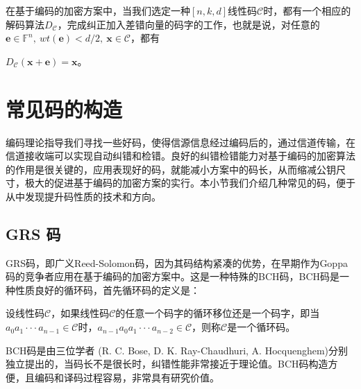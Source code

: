 \begin{define}[解码算法]
	在基于编码的加密方案中，当我们选定一种$[n,k,d]$线性码$\mathcal{C}$时，都有一个相应的解码算法$D_{\mathcal{C}}$，完成纠正加入差错向量的码字的工作，也就是说，对任意的$\textbf{e} \in \mathbb{F}^n,~wt(\textbf{e}) < d/2,~\textbf{x} \in \mathcal{C}$，都有
	
	\centering $D_{\mathcal{C}}(\textbf{x} + \textbf{e}) = \textbf{x}$。
\end{define}

\section{常见码的构造}
编码理论指导我们寻找一些好码，使得信源信息经过编码后的，通过信道传输，在信道接收端可以实现自动纠错和检错。良好的纠错检错能力对基于编码的加密算法的作用是很关键的，应用表现好的码，就能减小方案中的码长，从而缩减公钥尺寸，极大的促进基于编码的加密方案的实行。本小节我们介绍几种常见的码，便于从中发现提升码性质的技术和方向。

\subsection{GRS 码}
GRS码，即广义Reed-Solomon码，因为其码结构紧凑的优势，在早期作为Goppa码的竞争者应用在基于编码的加密方案中。这是一种特殊的BCH码，BCH码是一种性质良好的循环码，首先循环码的定义是：

\begin{define}[循环码]
	设线性码$\mathcal{C}$，如果线性码$\mathcal{C}$的任意一个码字的循环移位还是一个码字，即当$a_0a_1···a_{n-1} \in \mathcal{C}$时，$a_{n-1}a_0a_1···a_{n-2} \in \mathcal{C}$，则称$\mathcal{C}$是一个循环码。
\end{define}

BCH码是由三位学者 (R. C. Bose, D. K. Ray-Chaudhuri, A. Hocquenghem)分别独立提出的，当码长不是很长时，纠错性能非常接近于理论值。BCH码构造方便，且编码和译码过程容易，非常具有研究价值。

